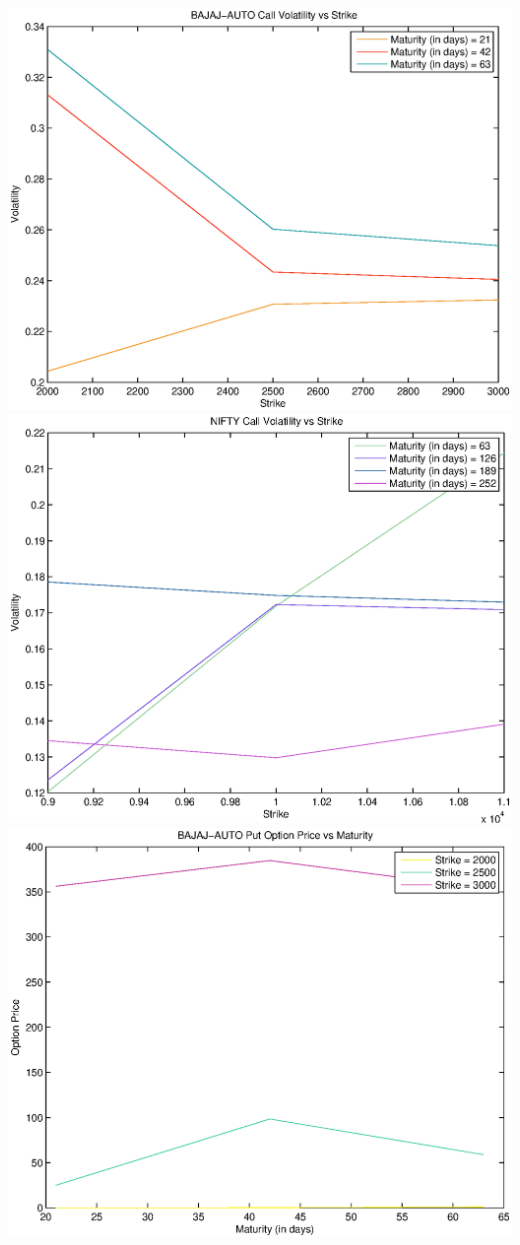\documentclass{article}
\begin{document}
\includegraphics[width=\textwidth]{BAJAJ-AUTO_Call_Volatility_vs_Strike} \\                
\includegraphics[width=\textwidth]{NIFTY_Call_Volatility_vs_Strike} \\
\includegraphics[width=\textwidth]{BAJAJ-AUTO_Put_Option_Price_vs_Maturity} \\             
\end{document}
